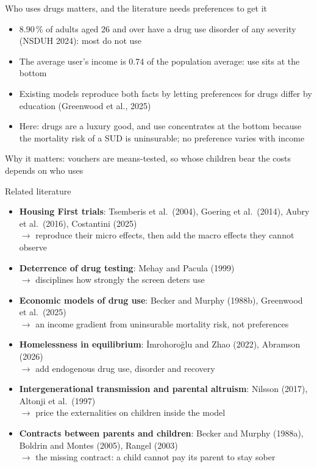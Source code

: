 \documentclass[aspectratio=169,11pt]{beamer}
\newcommand{\pc}{\,\%}
\begin{document}
\begin{frame}{Who uses drugs matters, and the literature needs preferences to get it}
\begin{itemize}\setlength\itemsep{0.5em}
\item 8.90\pc{} of adults aged 26 and over have a drug use disorder of any severity (NSDUH 2024): most do not use
\item The average user's income is 0.74 of the population average: use sits at the bottom
\item Existing models reproduce both facts by letting preferences for drugs differ by education (Greenwood et al., 2025)
\item Here: drugs are a luxury good, and use concentrates at the bottom because the \alert{mortality risk of a SUD is uninsurable}; no preference varies with income
\end{itemize}
\vspace{0.2cm}
Why it matters: vouchers are means-tested, so whose children bear the costs depends on who uses
\end{frame}

\begin{frame}{Related literature}
\footnotesize
\begin{itemize}\setlength\itemsep{0.3em}
\item \textbf{Housing First trials}: Tsemberis et al.\ (2004), Goering et al.\ (2014), Aubry et al.\ (2016), Costantini (2025)\\
$\to$ reproduce their micro effects, then add the macro effects they cannot observe
\item \textbf{Deterrence of drug testing}: Mehay and Pacula (1999)\\
$\to$ disciplines how strongly the screen deters use
\item \textbf{Economic models of drug use}: Becker and Murphy (1988b), Greenwood et al.\ (2025)\\
$\to$ an income gradient from uninsurable mortality risk, not preferences
\item \textbf{Homelessness in equilibrium}: \.{I}mrohoro\u{g}lu and Zhao (2022), Abramson (2026)\\
$\to$ add endogenous drug use, disorder and recovery
\item \textbf{Intergenerational transmission and parental altruism}: Nilsson (2017), Altonji et al.\ (1997)\\
$\to$ price the externalities on children inside the model
\item \textbf{Contracts between parents and children}: Becker and Murphy (1988a), Boldrin and Montes (2005), Rangel (2003)\\
$\to$ the missing contract: a child cannot pay its parent to stay sober
\end{itemize}
\end{frame}
\end{document}
